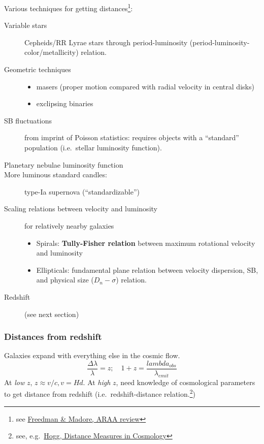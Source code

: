 \documentclass{article}
\newcommand{\mynotes}[1]{\textcolor{cadmiumgreen}{#1}}
\begin{document}
Various techniques for getting distances\footnote{see
\href{http://adsabs.harvard.edu/abs/2010ARA\%26A..48..673F}
{Freedman \& Madore, ARAA review}}:
\begin{description}
    \item [Variable stars] Cepheids/RR Lyrae stars through period-luminosity
        (period-luminosity-color/metallicity) relation.
    \item [Geometric techniques]
        \begin{itemize}
            \item masers (proper motion compared with radial velocity in
                central disks)
            \item exclipsing binaries
        \end{itemize}
    \item [SB fluctuations] from imprint of Poisson statistics:
        requires objects with a ``standard'' population (i.e.\ stellar
        luminosity function).
    \item [Planetary nebulae luminosity function]
    \item [More luminous standard candles:] type-Ia supernova (``standardizable'')
    \item [Scaling relations between velocity and luminosity]
        \mynotes{for relatively nearby galaxies}
        \begin{itemize}
            \item Spirals: \textbf{Tully-Fisher relation} between maximum
                rotational velocity and luminosity
            \item Ellipticals: fundamental plane relation between velocity
                dispersion, SB, and physical size
                ($D_{n}-\sigma$) relation.
        \end{itemize}
    \item [Redshift] (see next section)
\end{description}
\subsubsection{Distances from redshift}
Galaxies expand with everything else in the cosmic flow.
\[
    \frac{\Delta\lambda}{\lambda} = z;\quad
    1+z = \frac{lambda_{obs}}{\lambda_{emit}}
    \]
At \emph{low} $z$, $z \approx v/c, v=Hd$.
At \emph{high} $z$, need knowledge of cosmological
parameters to get distance from redshift (i.e.\ redshift-distance
relation.\footnote{see, e.g.\
\href{http://ned.ipac.caltech.edu/level5/Hogg/Hogg_contents.html}
{Hogg, Distance Measures in Cosmology}})
\end{document}
